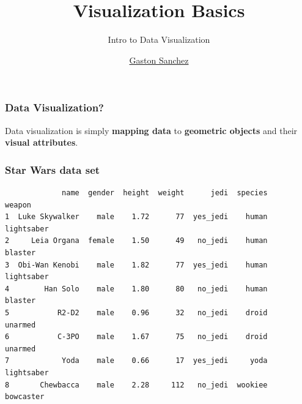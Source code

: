 \documentclass[12pt]{beamer}\usepackage[]{graphicx}\usepackage[]{color}
\title{Visualization Basics}
\subtitle{Intro to Data Visualization}
\author{\href{http://www.gastonsanchez.com}{Gaston Sanchez}}
\institute{\href{https://creativecommons.org/licenses/by-sa/4.0/}{\tt \scriptsize \color{foreground} CC BY-SA 4.0}}
\date{}
\makeatletter
\newenvironment{kframe}{%
 \def\at@end@of@kframe{}%
 \ifinner\ifhmode%
  \def\at@end@of@kframe{\end{minipage}}%
  \begin{minipage}{\columnwidth}%
 \fi\fi%
 \def\FrameCommand##1{\hskip\@totalleftmargin \hskip-\fboxsep
 \colorbox{shadecolor}{##1}\hskip-\fboxsep
     \hskip-\linewidth \hskip-\@totalleftmargin \hskip\columnwidth}%
 \MakeFramed {\advance\hsize-\width
   \@totalleftmargin\z@ \linewidth\hsize
   \@setminipage}}%
 {\par\unskip\endMakeFramed%
 \at@end@of@kframe}
\newenvironment{knitrout}{}{} %
\makeatother
\begin{document}
{
  \frame{\titlepage} 
}


\begin{frame}
\begin{center}
\Huge{}
\end{center}
\end{frame}


\begin{frame}
\frametitle{Data Visualization?}

\Large Data visualization is simply {\mdlit \textbf{mapping data}} to {\hilit \textbf{geometric objects}}
and their {\lit \textbf{visual attributes}}.

\end{frame}


\begin{frame}[fragile]
\frametitle{Star Wars data set}

\begin{knitrout}\scriptsize
{}\color{fgcolor}\begin{kframe}
\begin{verbatim}
             name  gender  height  weight      jedi  species      weapon
1  Luke Skywalker    male    1.72      77  yes_jedi    human  lightsaber
2     Leia Organa  female    1.50      49   no_jedi    human     blaster
3  Obi-Wan Kenobi    male    1.82      77  yes_jedi    human  lightsaber
4        Han Solo    male    1.80      80   no_jedi    human     blaster
5           R2-D2    male    0.96      32   no_jedi    droid     unarmed
6           C-3PO    male    1.67      75   no_jedi    droid     unarmed
7            Yoda    male    0.66      17  yes_jedi     yoda  lightsaber
8       Chewbacca    male    2.28     112   no_jedi  wookiee   bowcaster
\end{verbatim}
\end{kframe}
\end{knitrout}

\end{frame}

\end{document}
